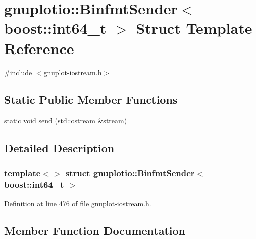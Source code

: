 \hypertarget{structgnuplotio_1_1_binfmt_sender_3_01boost_1_1int64__t_01_4}{}\section{gnuplotio\+:\+:Binfmt\+Sender$<$ boost\+:\+:int64\+\_\+t $>$ Struct Template Reference}
\label{structgnuplotio_1_1_binfmt_sender_3_01boost_1_1int64__t_01_4}


{\ttfamily \#include $<$gnuplot-\/iostream.\+h$>$}

\subsection*{Static Public Member Functions}
\begin{DoxyCompactItemize}
\item 
static void \hyperlink{structgnuplotio_1_1_binfmt_sender_3_01boost_1_1int64__t_01_4_a57423f02a4526e15d7d821606b1c8c81}{send} (std\+::ostream \&stream)
\end{DoxyCompactItemize}


\subsection{Detailed Description}
\subsubsection*{template$<$$>$\newline
struct gnuplotio\+::\+Binfmt\+Sender$<$ boost\+::int64\+\_\+t $>$}



Definition at line 476 of file gnuplot-\/iostream.\+h.



\subsection{Member Function Documentation}
\mbox{\label{structgnuplotio_1_1_binfmt_sender_3_01boost_1_1int64__t_01_4_a57423f02a4526e15d7d821606b1c8c81}} 
